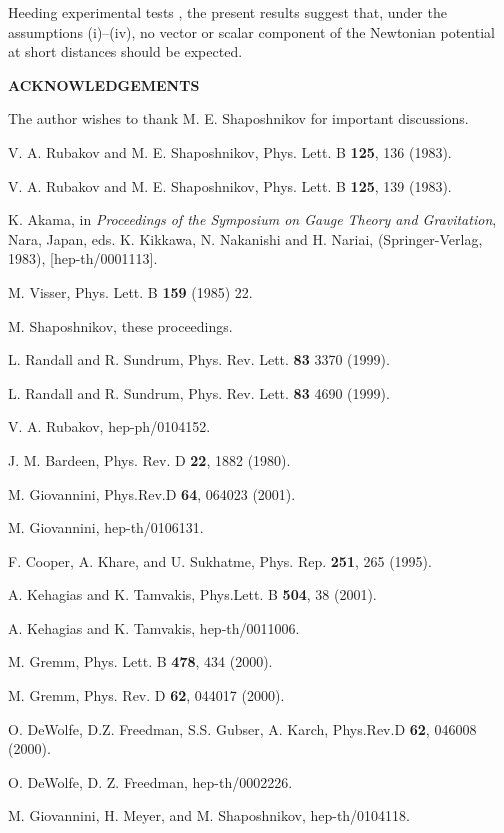 \documentclass[a4paper,12pt]{article}
\newcommand{\Acknowledgements}{\bigskip  \bigskip \begin{center} \begin{large}
             \bf ACKNOWLEDGEMENTS \end{large}\end{center}}
\begin{document}
Heeding experimental tests \cite{exp}, 
the present results suggest that, under the 
assumptions (i)--(iv), no vector or scalar component of the Newtonian 
potential at short distances should be expected.

\Acknowledgements
The author wishes to thank M. E. Shaposhnikov 
for important discussions.

\begin{thebibliography}{99}
 V. A. Rubakov and M. E. Shaposhnikov, Phys. Lett. 
B {\bf 125}, 136
(1983).

 V. A. Rubakov and M. E. Shaposhnikov, Phys. Lett. B {\bf 125}, 139
(1983).

 K. Akama, in {\em Proceedings of the 
Symposium on Gauge Theory and Gravitation}, Nara, Japan, 
eds. K. Kikkawa, N. Nakanishi and H. Nariai, (Springer-Verlag, 1983),
[hep-th/0001113].

 M. Visser, Phys. Lett. B {\bf 159} (1985) 22.

 M. Shaposhnikov, these proceedings. 

 L. Randall and R. Sundrum, Phys. 
Rev. Lett. {\bf 83} 3370 (1999). 

  L. Randall and R. Sundrum, Phys. 
Rev. Lett. {\bf 83} 4690 (1999). 

 V. A. Rubakov,  hep-ph/0104152.

 J. M. Bardeen, Phys. Rev. D {\bf 22}, 1882 (1980).

 M. Giovannini, Phys.Rev.D {\bf 64}, 064023 (2001). 

 M. Giovannini, hep-th/0106131. 

 F. Cooper, A. Khare, and U. Sukhatme, Phys. Rep. 
{\bf 251}, 265 (1995).

 A. Kehagias and K. Tamvakis, Phys.Lett. B {\bf 504}, 38 (2001).

 A. Kehagias and K. Tamvakis, hep-th/0011006.

 M. Gremm, Phys. Lett. B {\bf 478}, 434 (2000).

 M. Gremm,  Phys. Rev. D {\bf 62}, 044017 (2000).

 O. DeWolfe, D.Z. Freedman, S.S. Gubser, A. Karch, 
Phys.Rev.D {\bf 62}, 046008 (2000).  

 O. DeWolfe, D. Z. Freedman, hep-th/0002226. 

 M. Giovannini, H. Meyer, and M. Shaposhnikov, hep-th/0104118. 


\end{thebibliography}
\end{document}
